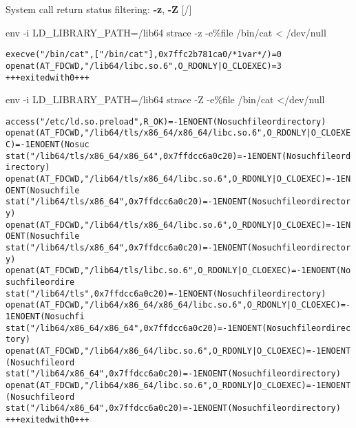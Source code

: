 \documentclass[unicode,aspectratio=169,xcolor={table,dvipsnames,usernames}]{beamer}
\begin{document}
\begin{frame}[fragile]{System call return status filtering: \textbf{-z}, \textbf{-Z} \hfill [\insertframenumber/\inserttotalframenumber]}
\scriptsize
\begin{block}{env -i LD\_LIBRARY\_PATH=/lib64 strace -z -e\%file /bin/cat < /dev/null}
\begin{alltt}
execve("/bin/cat", ["/bin/cat"], 0x7ffc2b781ca0 /* 1 var */) = 0
openat(AT_FDCWD, "/lib64/libc.so.6", O_RDONLY|O_CLOEXEC) = 3
+++ exited with 0 +++
\end{alltt}
\end{block}
\begin{block}{env -i LD\_LIBRARY\_PATH=/lib64 strace -Z -e\%file /bin/cat </dev/null}
\begin{alltt}
access("/etc/ld.so.preload", R_OK) = -1 ENOENT (No such file or directory)
openat(AT_FDCWD, "/lib64/tls/x86_64/x86_64/libc.so.6", O_RDONLY|O_CLOEXEC) = -1 ENOENT (No suc
stat("/lib64/tls/x86_64/x86_64", 0x7ffdcc6a0c20) = -1 ENOENT (No such file or directory)
openat(AT_FDCWD, "/lib64/tls/x86_64/libc.so.6", O_RDONLY|O_CLOEXEC) = -1 ENOENT (No such file
stat("/lib64/tls/x86_64", 0x7ffdcc6a0c20) = -1 ENOENT (No such file or directory)
openat(AT_FDCWD, "/lib64/tls/x86_64/libc.so.6", O_RDONLY|O_CLOEXEC) = -1 ENOENT (No such file
stat("/lib64/tls/x86_64", 0x7ffdcc6a0c20) = -1 ENOENT (No such file or directory)
openat(AT_FDCWD, "/lib64/tls/libc.so.6", O_RDONLY|O_CLOEXEC) = -1 ENOENT (No such file or dire
stat("/lib64/tls", 0x7ffdcc6a0c20) = -1 ENOENT (No such file or directory)
openat(AT_FDCWD, "/lib64/x86_64/x86_64/libc.so.6", O_RDONLY|O_CLOEXEC) = -1 ENOENT (No such fi
stat("/lib64/x86_64/x86_64", 0x7ffdcc6a0c20) = -1 ENOENT (No such file or directory)
openat(AT_FDCWD, "/lib64/x86_64/libc.so.6", O_RDONLY|O_CLOEXEC) = -1 ENOENT (No such file or d
stat("/lib64/x86_64", 0x7ffdcc6a0c20) = -1 ENOENT (No such file or directory)
openat(AT_FDCWD, "/lib64/x86_64/libc.so.6", O_RDONLY|O_CLOEXEC) = -1 ENOENT (No such file or d
stat("/lib64/x86_64", 0x7ffdcc6a0c20) = -1 ENOENT (No such file or directory)
+++ exited with 0 +++
\end{alltt}
\end{block}
\end{frame}
\end{document}
